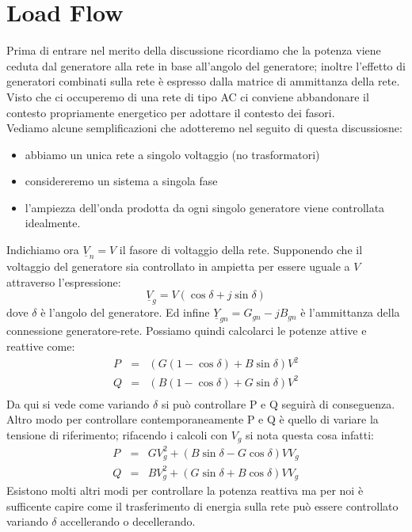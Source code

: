 \label{capitolo6}
\section{Load Flow}
Prima di entrare nel merito della discussione ricordiamo che la potenza viene ceduta dal generatore alla rete in base all'angolo del generatore; inoltre l'effetto di generatori combinati sulla rete è espresso dalla matrice di ammittanza della rete.\\
Visto che ci occuperemo di una rete di tipo AC ci conviene abbandonare il contesto propriamente energetico per adottare il contesto dei fasori.\\
Vediamo alcune semplificazioni che adotteremo nel seguito di questa discussiosne:
\begin{itemize}
\item abbiamo un unica rete a singolo voltaggio (no trasformatori)
\item considereremo un sistema a singola fase
\item l'ampiezza dell'onda prodotta da ogni singolo generatore viene controllata idealmente.
\end{itemize}
Indichiamo ora $\underline{V}_n= V$ il fasore di voltaggio della rete.
Supponendo che il voltaggio del generatore sia controllato in ampietta per essere uguale a $V$ attraverso l'espressione:
$$\underline{V}_g=V(\cos \delta+j\sin\delta)$$
dove $\delta$ è l'angolo del generatore.
Ed infine $\underline{Y}_{gn}=G_{gn}-jB_{gn}$ è l'ammittanza della connessione generatore-rete.
Possiamo quindi calcolarci le potenze attive e reattive come:
$$
\begin{array}{ccc}
P&=&(G(1-\cos\delta)+B\sin\delta)V^2\\
Q&=&(B(1-\cos\delta)+G\sin\delta)V^2\\
\end{array}
$$
Da qui si vede come variando $\delta$ si può controllare P e Q seguirà di conseguenza.
Altro modo per controllare contemporaneamente P e Q è quello di variare la tensione di riferimento; rifacendo i calcoli con $V_g$ si nota questa cosa infatti:
$$
\begin{array}{ccc}
P&=&GV_g^2+(B\sin\delta-G\cos\delta)VV_g\\
Q&=&BV_g^2+(G\sin\delta+B\cos\delta)VV_g
\end{array}
$$
Esistono molti altri modi per controllare la potenza reattiva ma per noi è sufficente capire come il trasferimento di energia sulla rete può essere controllato variando $\delta$ accellerando o decellerando.\\

